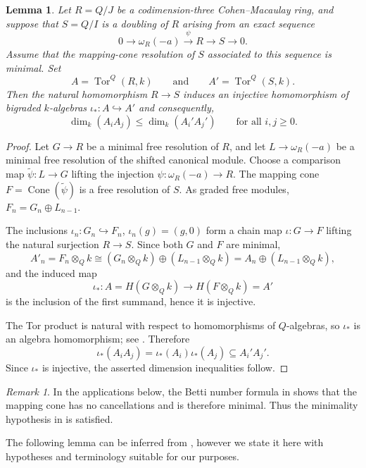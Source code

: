 \documentclass[reqno]{amsart}
\DeclareMathOperator{\Tor}{Tor}
\renewcommand{\S}{{\rm S}}
\theoremstyle{plain} %
\newtheorem{lemma}[theorem]{Lemma}
\theoremstyle{definition}
\theoremstyle{remark}
\newtheorem{remark}[theorem]{Remark}
\begin{document}
\begin{lemma}\label{pValue}
Let $R=Q/J$ be a codimension-three Cohen--Macaulay ring, and
suppose that $S=Q/I$ is a doubling of $R$ arising from an exact
sequence
\[
0\longrightarrow \omega_R(-a)
 \stackrel{\psi}{\longrightarrow} R
 \longrightarrow S
 \longrightarrow 0.
\]
Assume that the mapping-cone resolution of $S$ associated to this
sequence is minimal. Set
\[
A=\Tor^Q(R,k)
\qquad\text{and}\qquad
A'=\Tor^Q(S,k).
\]
Then the natural homomorphism $R\longrightarrow S$ induces an
injective homomorphism of bigraded $k$-algebras
$\iota_*:A\hookrightarrow A'$ and consequently,
\[
\dim_k(A_iA_j)\leq \dim_k(A_i'A_j')
\qquad\text{for all }i,j\geq0.
\]
\end{lemma}

\begin{proof}
Let $G\to R$ be a minimal free resolution of $R$, and let
$L\to\omega_R(-a)$ be a minimal free resolution of the shifted
canonical module. Choose a comparison map
$
\widetilde{\psi}:L\longrightarrow G
$ 
lifting the injection $\psi:\omega_R(-a)\to R$. The mapping cone $F=\operatorname{Cone}(\widetilde{\psi})$
is a free resolution of $S$. As graded free modules,
$F_n=G_n\oplus L_{n-1}$.

The inclusions $\iota_n:G_n\hookrightarrow F_n$,
$\iota_n(g)=(g,0)$ form a chain map $\iota:G\to F$ lifting the natural surjection
$R\to S$. Since both $G$ and $F$ are minimal,
\[
A'_n = F_n\otimes_Qk
 \cong
(G_n\otimes_Qk)\oplus(L_{n-1}\otimes_Qk)=A_n\oplus(L_{n-1}\otimes_Qk),
\]
and the induced map
\[
\iota_*:
A=H(G\otimes_Qk)\longrightarrow H(F\otimes_Qk)=A'
\]
is the inclusion of the first summand, hence it is injective. 

The Tor product is natural with respect to homomorphisms of $Q$-algebras, so $\iota_*$ is an algebra homomorphism; see \cite[Chapter~XI,~2.1 and \S 4]{CartanEilenberg}. Therefore
\[
\iota_*(A_iA_j)
 =
\iota_*(A_i)\iota_*(A_j)
 \subseteq A_i'A_j'.
\]
Since $\iota_*$ is injective, the asserted dimension inequalities follow.
\end{proof}

\begin{remark}
In the applications below, the Betti number formula in  shows that the mapping cone has no cancellations and is therefore minimal. Thus the minimality hypothesis in  is satisfied.
\end{remark}

The following lemma can be inferred from \cite{Gor_Six_Gen}, however we state it here with hypotheses and terminology suitable for our purposes. 
\end{document}
